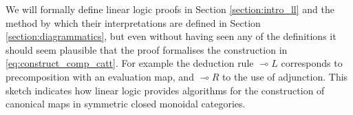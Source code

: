 \documentclass[english,letter paper,12pt,reqno]{article}
\theoremstyle{example}
\def\Hom{\operatorname{Hom}}
\begin{document}
We will formally define linear logic proofs in Section \ref{section:intro_ll} and the method by which their interpretations are defined in Section \ref{section:diagrammatics}, but even without having seen any of the definitions it should seem plausible that the proof formalises the construction in \eqref{eq:construct_comp_catt}. For example the deduction rule $\multimap L$ corresponds to precomposition with an evaluation map, and $\multimap R$ to the use of adjunction. This sketch indicates how linear logic provides algorithms for the construction of canonical maps in symmetric closed monoidal categories. %
\\



\end{document}
